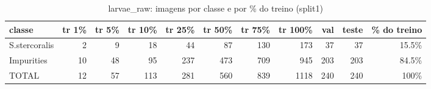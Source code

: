 \begin{table}[h]\centering\small
\caption{larvae_raw: imagens por classe e por \% do treino (split1)}
\begin{tabular}{lrrrrrrrrrr}\toprule
classe & tr 1\% & tr 5\% & tr 10\% & tr 25\% & tr 50\% & tr 75\% & tr 100\% & val & teste & \% do treino \\\midrule
S.stercoralis & 2 & 9 & 18 & 44 & 87 & 130 & 173 & 37 & 37 & 15.5\% \\
Impurities & 10 & 48 & 95 & 237 & 473 & 709 & 945 & 203 & 203 & 84.5\% \\
\midrule TOTAL & 12 & 57 & 113 & 281 & 560 & 839 & 1118 & 240 & 240 & 100\% \\\bottomrule
\end{tabular}\end{table}
